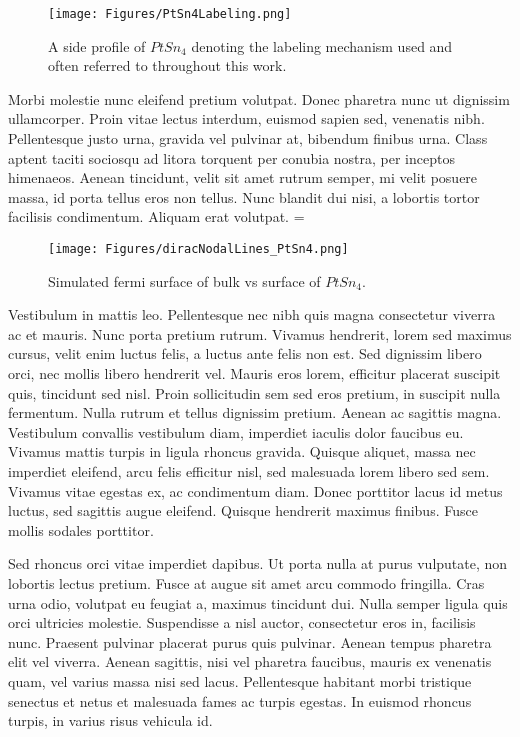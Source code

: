     \begin{figure}
        \centering
        \texttt{[image: Figures/PtSn4Labeling.png]}
        \caption{A side profile of $PtSn_4$ denoting the labeling mechanism used and often 						referred to throughout this work.}
        \label{fig:unitCellLabeling}
    \end{figure}

Morbi molestie nunc eleifend pretium volutpat. Donec pharetra nunc ut dignissim ullamcorper. Proin vitae lectus interdum, euismod sapien sed, venenatis nibh. Pellentesque justo urna, gravida vel pulvinar at, bibendum finibus urna. Class aptent taciti sociosqu ad litora torquent per conubia nostra, per inceptos himenaeos. Aenean tincidunt, velit sit amet rutrum semper, mi velit posuere massa, id porta tellus eros non tellus. Nunc blandit dui nisi, a lobortis tortor facilisis condimentum. Aliquam erat volutpat.
=
    \begin{figure}
        \centering
        \texttt{[image: Figures/diracNodalLines\_PtSn4.png]}
        \caption{Simulated fermi surface of bulk vs surface of $PtSn_4$. }
        \label{fig:nodalLines}
    \end{figure}

Vestibulum in mattis leo. Pellentesque nec nibh quis magna consectetur viverra ac et mauris. Nunc porta pretium rutrum. Vivamus hendrerit, lorem sed maximus cursus, velit enim luctus felis, a luctus ante felis non est. Sed dignissim libero orci, nec mollis libero hendrerit vel. Mauris eros lorem, efficitur placerat suscipit quis, tincidunt sed nisl. Proin sollicitudin sem sed eros pretium, in suscipit nulla fermentum. Nulla rutrum et tellus dignissim pretium. Aenean ac sagittis magna. Vestibulum convallis vestibulum diam, imperdiet iaculis dolor faucibus eu. Vivamus mattis turpis in ligula rhoncus gravida. Quisque aliquet, massa nec imperdiet eleifend, arcu felis efficitur nisl, sed malesuada lorem libero sed sem. Vivamus vitae egestas ex, ac condimentum diam. Donec porttitor lacus id metus luctus, sed sagittis augue eleifend. Quisque hendrerit maximus finibus. Fusce mollis sodales porttitor.

Sed rhoncus orci vitae imperdiet dapibus. Ut porta nulla at purus vulputate, non lobortis lectus pretium. Fusce at augue sit amet arcu commodo fringilla. Cras urna odio, volutpat eu feugiat a, maximus tincidunt dui. Nulla semper ligula quis orci ultricies molestie. Suspendisse a nisl auctor, consectetur eros in, facilisis nunc. Praesent pulvinar placerat purus quis pulvinar. Aenean tempus pharetra elit vel viverra. Aenean sagittis, nisi vel pharetra faucibus, mauris ex venenatis quam, vel varius massa nisi sed lacus. Pellentesque habitant morbi tristique senectus et netus et malesuada fames ac turpis egestas. In euismod rhoncus turpis, in varius risus vehicula id.

